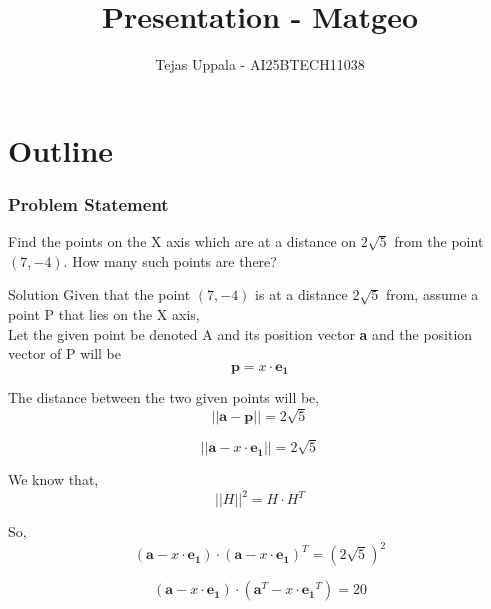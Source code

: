 \documentclass{beamer}
\title{Presentation - Matgeo}
\author{Tejas Uppala - AI25BTECH11038}
\providecommand{\brak}[1]{\ensuremath{\left(#1\right)}}
\theoremstyle{remark}
\numberwithin{equation}{section}
\begin{document}
\begin{frame}
\titlepage
\end{frame}

\section*{Outline}


\begin{frame}
\frametitle{Problem Statement}
Find the points on the X axis which are at a distance on $2 \sqrt{5}$ from the point $\brak{7, {-4}}$. How many such points are there?
\end{frame}

\begin{frame}{Solution}
 Given that the point $\brak{7, {-4}}$ is at a distance $2 \sqrt{5}$ from, assume a point P that lies on the X axis,\\ 
   Let the given point be denoted A and its position vector \textbf{a} and the position vector of P will be 
\begin{equation}
\textbf{p} = x\cdot \mathbf{e_1}
\end{equation}

    \noindent The distance between the two given points will be,
\begin{equation}
||\textbf{a} - \textbf{p}|| = 2 \sqrt{5}
\end{equation}

\begin{equation}
||\textbf{a} - x\cdot \mathbf{e_1} || = 2 \sqrt{5}
\end{equation}

    \noindent We know that, 
\begin{equation}
||H||^2 = H \cdot H^T
\end{equation}

    \noindent So,
\begin{equation}
(\textbf{a} - x\cdot \mathbf{e_1})\cdot (\textbf{a} - x\cdot \mathbf{e_1})^T = (2\sqrt{5})^2
\end{equation}

\begin{equation}
(\textbf{a} - x\cdot \mathbf{e_1})\cdot (\textbf{a}^T - x\cdot \mathbf{e_1}^T) = 20
\end{equation}
\end{frame}
\end{document}
